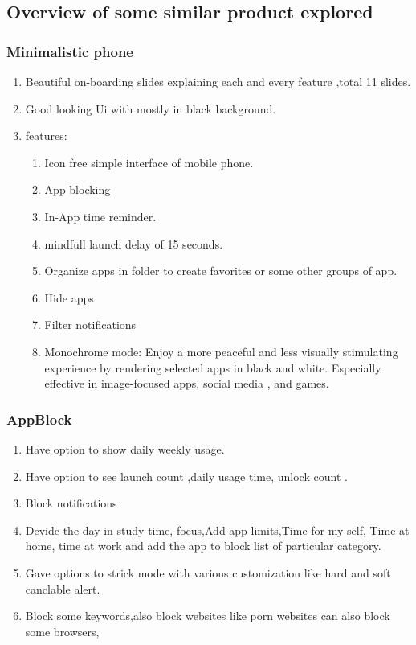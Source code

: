 \documentclass[12pt]{article}
\begin{document}
    \subsection{Overview of some similar product explored}
    \subsubsection{Minimalistic phone}
    \begin{enumerate}
        \item Beautiful on-boarding slides explaining each and every feature ,total 11 slides.
        \item Good looking Ui with mostly in black background.
        \item features:
        \begin{enumerate}
            \item Icon free simple interface of mobile phone.
            \item App blocking 
            \item In-App time reminder.
            \item mindfull launch delay of 15 seconds.
            \item Organize apps in folder to create favorites or some other groups of app.
            \item Hide apps
            \item Filter notifications
            \item Monochrome mode: Enjoy a more peaceful and less visually stimulating experience by rendering selected apps in black and white. Especially effective in image-focused apps, social media , and games.
        \end{enumerate}
    \end{enumerate}
    \subsubsection{AppBlock}
    \begin{enumerate}
        \item Have option to show daily weekly usage.
        \item Have option to see launch count ,daily usage time, unlock count .
        \item Block notifications
        \item Devide the day in study time, focus,Add app limits,Time for my self, Time at home, time at work and add the app to block list of particular category.
        \item Gave options to strick mode with various customization like hard and soft canclable alert.
        \item Block some keywords,also block websites like porn websites can also block some browsers,
    \end{enumerate}
    
\end{document}
